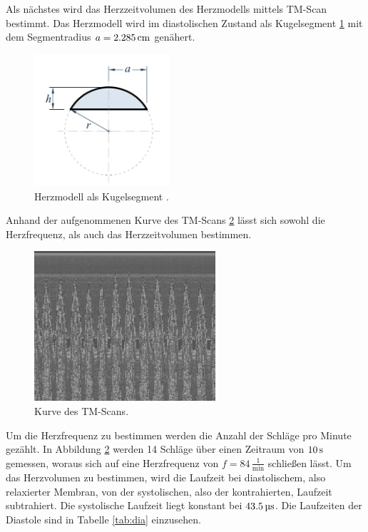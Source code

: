 Als nächstes wird das Herzzeitvolumen des Herzmodells mittels TM-Scan bestimmt.
Das Herzmodell wird im diastolischen Zustand als Kugelsegment \ref{fig:kugel}
mit dem Segmentradius $a=2.285\,\si{\centi\meter}$ genähert.
\begin{figure}[H]
  \centering
  \includegraphics[width=5cm]{bilder/kugel.png}
  \caption{Herzmodell als Kugelsegment \cite{kugel}.}
  \label{fig:kugel}
\end{figure}
Anhand der aufgenommenen Kurve des TM-Scans \ref{fig:tm} lässt sich sowohl die
Herzfrequenz, als auch das Herzzeitvolumen bestimmen.
\begin{figure}[H]
  \centering
  \includegraphics[width=0.6\textwidth]{bilder/TM-ScanHerz2.jpg}
  \caption{Kurve des TM-Scans.}
  \label{fig:tm}
\end{figure}
Um die Herzfrequenz zu bestimmen werden die Anzahl der Schläge pro Minute
gezählt. In Abbildung \ref{fig:tm} werden 14 Schläge über einen Zeitraum von
$10\,\si{\second}$ gemessen, woraus sich auf eine Herzfrequenz von $f = 84\,\frac{1}{\si{\minute}}$
schließen lässt.
Um das Herzvolumen zu bestimmen, wird die Laufzeit bei diastolischem, also
relaxierter Membran, von der systolischen, also der kontrahierten, Laufzeit
subtrahiert. Die systolische Laufzeit liegt konstant bei $43.5\,\si{\micro\second}$.
 Die
Laufzeiten der Diastole sind in Tabelle \ref{tab:dia} einzusehen.

